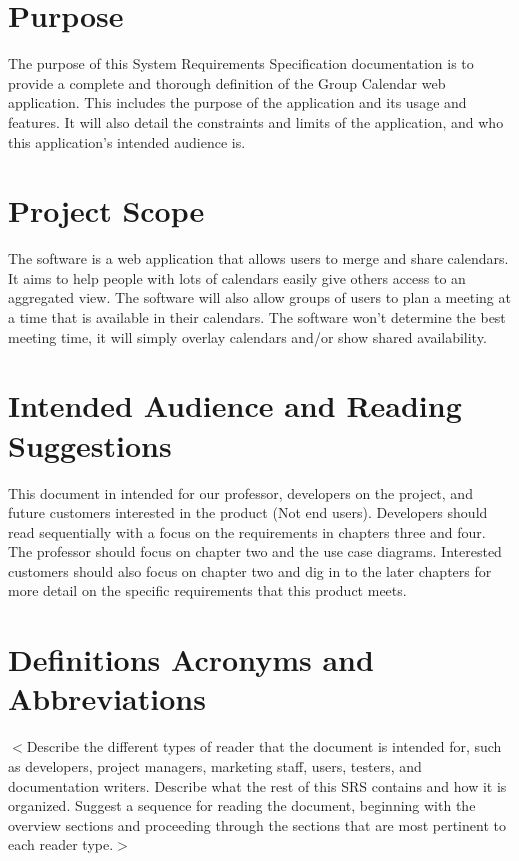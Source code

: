 \documentclass{scrreprt}
\begin{document}
\section{Purpose}

The purpose of this System Requirements Specification documentation is to provide a complete and thorough definition of the Group Calendar web application. This includes the purpose of the application and its usage and features. It will also detail the constraints and limits of the application, and who this application's intended audience is.


\section{Project Scope}

The software is a web application that allows users to merge and share calendars. It aims to help people with lots of calendars easily give others access to an aggregated view. The software will also allow groups of users to plan a meeting at a time that is available in their calendars. The software won’t determine the best meeting time, it will simply overlay calendars and/or show shared availability.


\section{Intended Audience and Reading Suggestions}

This document in intended for our professor, developers on the project, and future customers interested in the product (Not end users). Developers should read sequentially with a focus on the requirements in chapters three and four. The professor should focus on chapter two and the use case diagrams. Interested customers should also focus on chapter two and dig in to the later chapters for more detail on the specific requirements that this product meets.


\section{Definitions Acronyms and Abbreviations}
$<$Describe the different types of reader that the document is intended for,
such as developers, project managers, marketing staff, users, testers, and
documentation writers. Describe what the rest of this SRS contains and how it is
organized. Suggest a sequence for reading the document, beginning with the
overview sections and proceeding through the sections that are most pertinent to
each reader type.$>$
\end{document}
